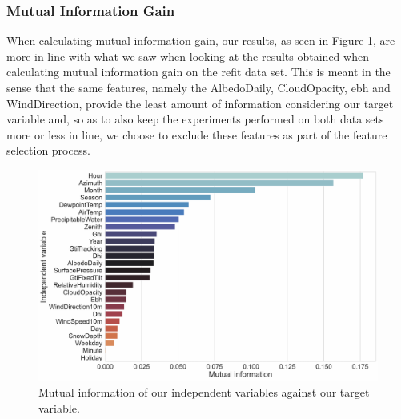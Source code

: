 \subsubsection{Mutual Information Gain}
\label{subsubsec:Exploratory-Data-Analysis:UCID:Causality-and-Correlation:Mutual-Information-Gain}
When calculating mutual information gain, our results, as seen in Figure \ref{fig:UCID-Mutual-Information-Gain}, are more in line with what we saw when looking at the results obtained when calculating mutual information gain on the \gls{refit} data set. This is meant in the sense that the same features, namely the AlbedoDaily, CloudOpacity, \gls{ebh} and WindDirection, provide the least amount of information considering our target variable and, so as to also keep the experiments performed on both data sets more or less in line, we choose to exclude these features as part of the feature selection process.

\begin{figure}[H]
    \centering
    \includegraphics[width=\textwidth]{Images/Chapter 5/UCID/UCID-Mutual-Information.pdf}
    \caption{Mutual information of our independent variables against our target variable.}
    \label{fig:UCID-Mutual-Information-Gain}
\end{figure}